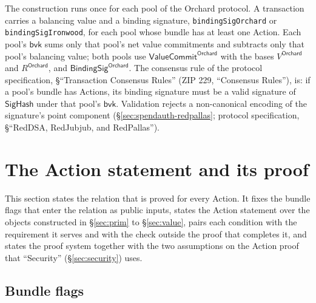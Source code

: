 \documentclass[11pt,a4paper]{article}
\theoremstyle{definition}
\begin{document}
The construction runs once for each pool of the Orchard protocol. A
transaction carries a balancing value and a binding signature,
\texttt{bindingSigOrchard} or \texttt{bindingSigIronwood}, for each pool
whose bundle has at least one Action. Each pool's $\mathsf{bvk}$ sums only
that pool's net value commitments and subtracts only that pool's balancing
value; both pools use $\mathsf{ValueCommit}^{\mathsf{Orchard}}$ with the
bases $V^{\mathsf{Orchard}}$ and $R^{\mathsf{Orchard}}$, and
$\mathsf{BindingSig}^{\mathsf{Orchard}}$. The consensus rule of the protocol
specification, \S``Transaction Consensus Rules'' (ZIP 229, ``Consensus
Rules''), is: if a pool's bundle has Actions, its binding signature must be
a valid signature of $\mathsf{SigHash}$ under that pool's $\mathsf{bvk}$.
Validation rejects a non-canonical encoding of the signature's point
component (\S\ref{sec:spendauth-redpallas}; protocol specification,
\S``RedDSA, RedJubjub, and RedPallas'').

\section{The Action statement and its proof}\label{sec:action}

This section states the relation that is proved for every Action. It fixes
the bundle flags that enter the relation as public inputs, states the Action
statement over the objects constructed in \S\ref{sec:prim} to
\S\ref{sec:value}, pairs each condition with the requirement it serves and
with the check outside the proof that completes it, and states the proof
system together with the two assumptions on the Action proof that
``Security'' (\S\ref{sec:security}) uses.

\subsection{Bundle flags}\label{sec:action-flags}
\end{document}
